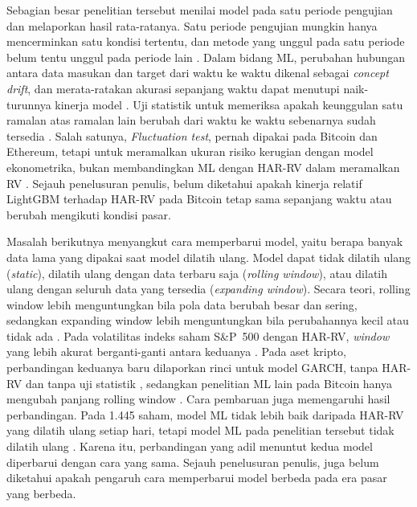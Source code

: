 Sebagian besar penelitian tersebut menilai model pada satu periode pengujian
dan melaporkan hasil rata-ratanya. Satu periode pengujian mungkin hanya
mencerminkan satu kondisi tertentu, dan metode yang unggul pada satu periode
belum tentu unggul pada periode lain \cite{tashman2000}. Dalam bidang ML,
perubahan hubungan antara data masukan dan target dari waktu ke waktu dikenal
sebagai \textit{concept drift}, dan merata-ratakan akurasi sepanjang waktu
dapat menutupi naik-turunnya kinerja model \cite{gama2014}. Uji statistik untuk
memeriksa apakah keunggulan satu ramalan atas ramalan lain berubah dari waktu
ke waktu sebenarnya sudah tersedia \cite{giacomini2010,martins2016}. Salah
satunya, \textit{Fluctuation test}, pernah dipakai pada Bitcoin dan Ethereum,
tetapi untuk meramalkan ukuran risiko kerugian dengan model ekonometrika,
bukan membandingkan ML dengan HAR-RV dalam meramalkan RV \cite{trucios2023}.
Sejauh penelusuran penulis, belum diketahui apakah kinerja relatif LightGBM
terhadap HAR-RV pada Bitcoin tetap sama sepanjang waktu atau berubah mengikuti
kondisi pasar.

Masalah berikutnya menyangkut cara memperbarui model, yaitu berapa banyak data
lama yang dipakai saat model dilatih ulang. Model dapat tidak dilatih ulang
(\textit{static}), dilatih ulang dengan data terbaru saja (\textit{rolling
window}), atau dilatih ulang dengan seluruh data yang tersedia
(\textit{expanding window}). Secara teori, rolling window lebih menguntungkan
bila pola data berubah besar dan sering, sedangkan expanding window lebih
menguntungkan bila perubahannya kecil atau tidak ada \cite{rossi2013}. Pada
volatilitas indeks saham S\&P~500 dengan HAR-RV, \textit{window} yang lebih
akurat berganti-ganti antara keduanya \cite{feng2024window}. Pada aset kripto,
perbandingan keduanya baru dilaporkan rinci untuk model GARCH, tanpa HAR-RV
dan tanpa uji statistik \cite{akgun2025}, sedangkan penelitian ML lain pada
Bitcoin hanya mengubah panjang rolling window \cite{feng2024ml}. Cara
pembaruan juga memengaruhi hasil perbandingan. Pada 1.445 saham, model ML
tidak lebih baik daripada HAR-RV yang dilatih ulang setiap hari, tetapi model
ML pada penelitian tersebut tidak dilatih ulang \cite{chassot2026}. Karena itu,
perbandingan yang adil menuntut kedua model diperbarui dengan cara yang sama.
Sejauh penelusuran penulis, juga belum diketahui apakah pengaruh cara
memperbarui model berbeda pada era pasar yang berbeda.

